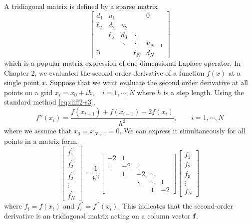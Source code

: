 A tridiagonal matrix is defined by a sparse matrix
\begin{equation}
\begin{bmatrix}
d_1 & u_1 &        &        &     0   \\
\ell_2 & d_2 & u_2    &        &         \\
    & \ell_3 & d_3    & \ddots &         \\
    &     & \ddots & \ddots & u_{N-1} \\
 0  &     &        & \ell_N    & d_N
\end{bmatrix}
\end{equation}
which is a popular matrix expression of one-dimensional Laplace operator.  In Chapter 2, we evaluated the second order derivative of a function $f(x)$ at a single point $x$.  Suppose that we want evaluate the second order derivative at all points on a grid $x_i=x_0+i h, \quad i=1, \cdots, N$ where $h$ is a step length. Using the standard method \eqref{eq:diff2-s3},
\begin{equation}
f''(x_i) = \frac{f(x_{i+1})+f(x_{i-1})-2 f(x_i)}{h^2}, \qquad i=1,\cdots, N
\end{equation}
where we assume that $x_0=x_{N+1}=0$.  We can express it simultaneously for all points in a matrix form.
\begin{equation}
\begin{bmatrix} f^{\prime\prime}_1 \\f^{\prime\prime}_2 \\ f^{\prime\prime}_2 \\ \vdots \\ f^{\prime\prime}_N\end{bmatrix}
=
\frac{1}{h^2}
\begin{bmatrix}
-2 &  1 &         &        &   \\ 
 1 & -2 &       1 &        &   \\
   &  1 &      -2 & \ddots &   \\
   &    &  \ddots & \ddots & 1 \\
   &    &         &     1  & -2
\end{bmatrix}
\begin{bmatrix} f_1 \\f_2\\  f_3 \\ \vdots \\ f_N \end{bmatrix}
\end{equation}
where $f_i = f(x_i)$ and $f^{\prime\prime}_i = f^{\prime\prime}(x_i)$.  This indicates that the second-order derivative is an tridiagonal matrix acting on a column vector $\vb{f}$.

